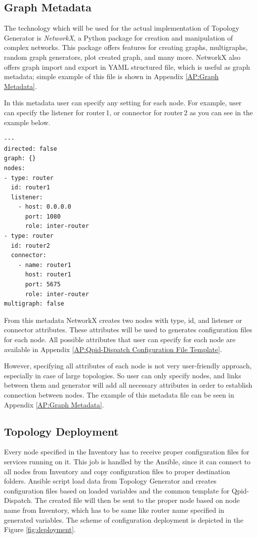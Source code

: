 
\subsection{Graph Metadata}
\label{Graph Metadata}
The technology which will be used for the actual implementation of Topology Generator is \emph{NetworkX}, a Python package for creation and manipulation of complex networks. This package offers features for creating graphs, multigraphs, random graph generators, plot created graph, and many more. NetworkX also offers graph import and export in YAML structured file, which is useful as graph metadata; simple example of this file is shown in Appendix \ref{AP:Graph Metadata}.

In this metadata user can specify any setting for each node. For example, user can specify the listener for router\,1, or connector for router\,2 as you can see in the example below.

\begin{verbatim}
---
directed: false
graph: {}
nodes:
- type: router
  id: router1
  listener:
  	- host: 0.0.0.0
  	  port: 1080
  	  role: inter-router
- type: router
  id: router2
  connector:
  	- name: router1
  	  host: router1
  	  port: 5675
  	  role: inter-router
multigraph: false
\end{verbatim}
From this metadata NetworkX creates two nodes with type, id, and listener or connector attributes. These attributes will be used to generates configuration files for each node. All possible attributes that user can specify for each node are available in Appendix \ref{AP:Qpid-Dispatch Configuration File Template}.

However, specifying all attributes of each node is not very user-friendly approach, especially in case of large topologies. So user can only specify nodes, and links between them and generator will add all necessary attributes in order to establish connection between nodes. The example of this metadata file can be seen in Appendix \ref{AP:Graph Metadata}.

\subsection{Topology Deployment}
Every node specified in the Inventory has to receive proper configuration files for services running on it. This job is handled by the Ansible, since it can connect to all nodes from Inventory and copy configuration files to proper destination folders. Ansible script load data from Topology Generator and creates configuration files based on loaded variables and the common template for Qpid-Dispatch. The created file will then be sent to the proper node based on node name from Inventory, which has to be same like router name specified in generated variables. The scheme of configuration deployment is depicted in the Figure \ref{fig:deployment}.

